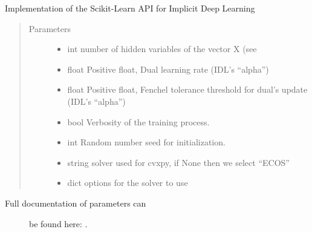 \documentclass[letterpaper,10pt,english]{sphinxmanual}
\begin{document}
\begin{fulllineitems}
\label{\detokenize{sections/learning:IDL.IDLModel}}
Implementation of the Scikit-Learn API for Implicit Deep Learning
\begin{quote}\begin{description}
\item[{Parameters}] \leavevmode\begin{itemize}
\item {} 
 \textendash{} int
number of hidden variables of the vector X (see

\item {} 
 \textendash{} float
Positive float, Dual learning rate (IDL’s “alpha”)

\item {} 
 \textendash{} float
Positive float, Fenchel tolerance threshold for dual’s update (IDL’s “alpha”)

\item {} 
 \textendash{} bool
Verbosity of the training process.

\item {} 
 \textendash{} int
Random number seed for initialization.

\item {} 
 \textendash{} string
solver used for cvxpy, if None then we select “ECOS”

\item {} 
 \textendash{} dict
options for the solver to use

\end{itemize}

\end{description}\end{quote}
\begin{description}
\item[{Full documentation of parameters can}] \leavevmode
be found here: .


\end{description}
\end{fulllineitems}
\end{document}
